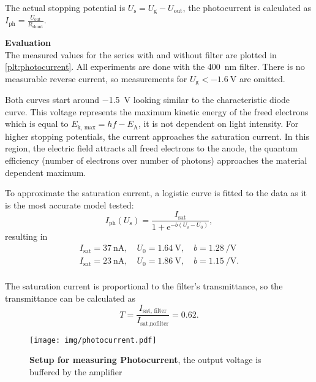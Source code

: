 The actual stopping potential is $U_\text{s} = U_\text{g} - U_\text{out}$, the photocurrent is calculated as $I_\text{ph} = \frac{U_\text{out}}{R_\text{shunt}}$.

\textbf{Evaluation}\\
The measured values for the series with and without filter are plotted in \autoref{plt:photocurrent}.
All experiments are done with the \SI{400}{\nm} filter.
There is no measurable reverse current, so measurements for $U_\text{g} < \SI{-1.6}{\volt}$ are omitted.

Both curves start around \SI{-1.5}{\volt} looking similar to the characteristic diode curve.
This voltage represents the maximum kinetic energy of the freed electrons which is equal to $E_\text{k, max} = hf - E_\text{A}$, it is not dependent on light intensity.
For higher stopping potentials, the current approaches the saturation current.
In this region, the electric field attracts all freed electrons to the anode, the quantum efficiency (number of electrons over number of photons) approaches the material dependent maximum.

To approximate the saturation current, a logistic curve is fitted to the data as it is the most accurate model tested:
\begin{equation*}
	I_\text{ph}(U_\text{s}) = \frac{I_\text{sat}}{1 + \mathrm{e}^{-b (U_\text{s} - U_0)}},
\end{equation*}
resulting in
\begin{gather*}
	I_\text{sat} = \SI{37}{\nA}, \quad U_0 = \SI{1.64}{\volt}, \quad b = \SI{1.28}{\per\volt} \tag{no filter}\\
	I_\text{sat} = \SI{23}{\nA}, \quad U_0 = \SI{1.86}{\volt}, \quad b = \SI{1.15}{\per\volt}. \tag{filter}\\
\end{gather*}

The saturation current is proportional to the filter's transmittance, so the transmittance can be calculated as
\begin{equation*}
	T = \frac{I_\text{sat, filter}}{I_\text{sat,nofilter}} = \num{0.62}.
\end{equation*}

\begin{figure}[tbp]
	\centering
	\texttt{[image: img/photocurrent.pdf]}
	\caption[Setup for measuring Photocurrent]{\textbf{Setup for measuring Photocurrent}, the output voltage is buffered by the amplifier}
	\label{sch:photocurrent}
\end{figure}


